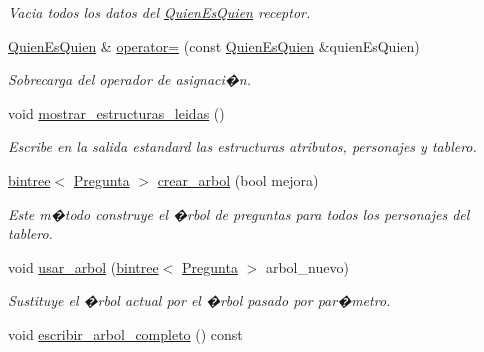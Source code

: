\begin{DoxyCompactItemize}
\begin{DoxyCompactList}\small\item\em Vacia todos los datos del \hyperlink{classQuienEsQuien}{Quien\+Es\+Quien} receptor. \end{DoxyCompactList}\item 
\hyperlink{classQuienEsQuien}{Quien\+Es\+Quien} \& \hyperlink{classQuienEsQuien_ae7a4139787934cca03996687460935dd}{operator=} (const \hyperlink{classQuienEsQuien}{Quien\+Es\+Quien} \&quien\+Es\+Quien)
\begin{DoxyCompactList}\small\item\em Sobrecarga del operador de asignaci�n. \end{DoxyCompactList}\item 
void \hyperlink{classQuienEsQuien_a67a107f9ffee5bf65cc0884fa39d66cf}{mostrar\+\_\+estructuras\+\_\+leidas} ()\hypertarget{classQuienEsQuien_a67a107f9ffee5bf65cc0884fa39d66cf}{}\label{classQuienEsQuien_a67a107f9ffee5bf65cc0884fa39d66cf}

\begin{DoxyCompactList}\small\item\em Escribe en la salida estandard las estructuras atributos, personajes y tablero. \end{DoxyCompactList}\item 
\hyperlink{classbintree}{bintree}$<$ \hyperlink{classPregunta}{Pregunta} $>$ \hyperlink{classQuienEsQuien_af03eb2b0cb492c583d3089182235300d}{crear\+\_\+arbol} (bool mejora)\hypertarget{classQuienEsQuien_af03eb2b0cb492c583d3089182235300d}{}\label{classQuienEsQuien_af03eb2b0cb492c583d3089182235300d}

\begin{DoxyCompactList}\small\item\em Este m�todo construye el �rbol de preguntas para todos los personajes del tablero. \end{DoxyCompactList}\item 
void \hyperlink{classQuienEsQuien_a0949bd026c2beeaacbf36fd0ba6fc3a9}{usar\+\_\+arbol} (\hyperlink{classbintree}{bintree}$<$ \hyperlink{classPregunta}{Pregunta} $>$ arbol\+\_\+nuevo)
\begin{DoxyCompactList}\small\item\em Sustituye el �rbol actual por el �rbol pasado por par�metro. \end{DoxyCompactList}\item 
void \hyperlink{classQuienEsQuien_a1b8c88bef5056bdd366810d180d29d94}{escribir\+\_\+arbol\+\_\+completo} () const \hypertarget{classQuienEsQuien_a1b8c88bef5056bdd366810d180d29d94}{}\label{classQuienEsQuien_a1b8c88bef5056bdd366810d180d29d94}


\end{DoxyCompactItemize}
